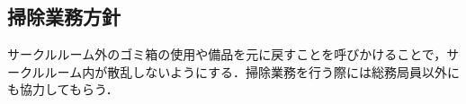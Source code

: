 \subsection*{掃除業務方針}

サークルルーム外のゴミ箱の使用や備品を元に戻すことを呼びかけることで，サークルルーム内が散乱しないようにする．掃除業務を行う際には総務局員以外にも協力してもらう．
